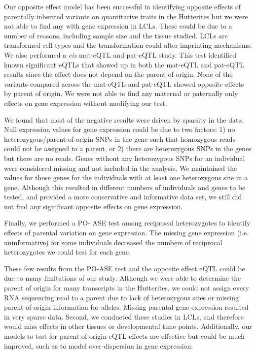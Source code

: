 Our opposite effect model has been successful in identifying opposite effects of parentally inherited variants on quantitative traits in the Hutterites but we were not able to find any with gene expression in LCLs. These could be due to a number of reasons, including sample size and the tissue studied. LCLs are transformed cell types and the transformation could alter imprinting mechanisms. We also performed a \emph{cis} mat-eQTL and pat-eQTL study. This test identified known significant eQTLs that showed up in both the mat-eQTL and pat-eQTL results since the effect does not depend on the parent of origin. None of the variants compared across the mat-eQTL and pat-eQTL showed opposite effects by parent of origin. We were not able to find any maternal or paternally only effects on gene expression without modifying our test.

We found that most of the negative results were driven by sparsity in the data. Null expression values for gene expression could be due to two factors: 1) no heterozygous/parent-of-origin SNPs in the gene such that homozygous reads could not be assigned to a parent, or 2) there are heterozygous SNPs in the genes but there are no reads. Genes without any heterozygous SNPs for an individual were considered missing and not included in the analysis. We maintained the values for those genes for the individuals with at least one heterozygous site in a gene. Although this resulted in different numbers of individuals and genes to be tested, and provided a more conservative and informative data set, we still did not find any significant opposite effects on gene expression.

Finally, we performed a PO- ASE test among reciprocal heterozygotes to identify effects of parental variation on gene expression. The missing gene expression (i.e. uninformative) for some individuals decreased the numbers of reciprocal heterozygotes we could test for each gene.

These few results from the PO-ASE test and the opposite effect eQTL could be due to many limitations of our study. Although we were able to determine the parent of origin for many transcripts in the Hutterites, we could not assign every RNA sequencing read to a parent due to lack of heterozygous sites or missing parent-of-origin information for alleles. Missing parental gene expression resulted in very sparse data. Second, we conducted these studies in LCLs, and therefore would miss effects in other tissues or developmental time points. Additionally, our models to test for parent-of-origin eQTL effects are effective but could be much improved, such as to model over-dispersion in gene expression.

